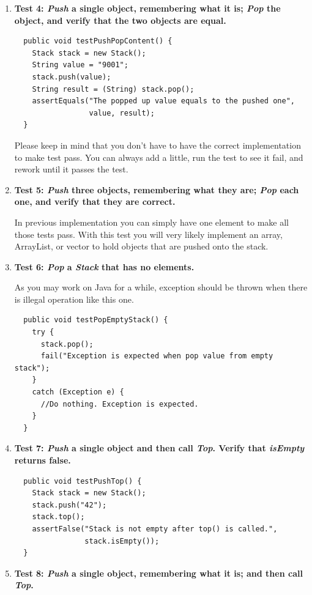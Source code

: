 \begin{enumerate}
\item {\textbf{Test 4: {\em Push} a single object, remembering what it is; {\em Pop} the object, and verify that the two objects are equal.}}

{\small\begin{verbatim}
  public void testPushPopContent() {	
    Stack stack = new Stack();
    String value = "9001";
    stack.push(value);
    String result = (String) stack.pop();
    assertEquals("The popped up value equals to the pushed one", 
                 value, result);
  }
\end{verbatim}}

Please keep in mind that you don't have to have the correct
implementation to make test pass. You can always add a little, run the
test to see it fail, and rework until it passes the test.

\item {\textbf{Test 5: {\em Push} three objects, remembering what they are; {\em Pop} each one, and verify that they are correct.}}

In previous implementation you can simply have one element to make all
those tests pass. With this test you will very likely implement an
array, ArrayList, or vector to hold objects that are pushed onto the
stack.

\item {\textbf{Test 6: {\em Pop} a {\em Stack} that has no elements.}}

As you may work on Java for a while, exception should be thrown when
there is illegal operation like this one.
{\small\begin{verbatim}
  public void testPopEmptyStack() {
    try {
      stack.pop();
      fail("Exception is expected when pop value from empty stack"); 
    }
    catch (Exception e) {
      //Do nothing. Exception is expected.
    }  
  }
\end{verbatim}}

\item {\textbf{Test 7: {\em Push} a single object and then call {\em Top}. Verify that {\em isEmpty} returns false.}}

{\small\begin{verbatim}
  public void testPushTop() {
    Stack stack = new Stack();
    stack.push("42");
    stack.top();
    assertFalse("Stack is not empty after top() is called.", 
                stack.isEmpty());
  }
\end{verbatim}}

\item {\textbf{Test 8: {\em Push} a single object, remembering what it is; and then call {\em Top}.}}


\end{enumerate}
